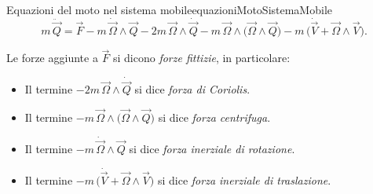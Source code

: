 \begin{remark}{Equazioni del moto nel sistema mobile}{equazioniMotoSistemaMobile}
	\[
		m\,\ddot{\vec{Q}} = \vec{F} - m\,\dot{\vec{\Omega}}\wedge\vec{Q}-2m\,\vec{\Omega}\wedge\dot{\vec{Q}}-m\,\vec{\Omega}\wedge\big(\vec{\Omega}\wedge\vec{Q}\big) -m\,\big(\dot{\vec{V}}+\vec{\Omega}\wedge\vec{V}\big).
	\]
\end{remark}

\begin{notz}
	Le forze aggiunte a \(\vec{F}\) si dicono \emph{forze fittizie}, in particolare:
	\begin{itemize}
		\item Il termine \(-2m\,\vec{\Omega}\wedge\dot{\vec{Q}}\) si dice \emph{forza di Coriolis}.
		\item Il termine \(-m\,\vec{\Omega}\wedge\big(\vec{\Omega}\wedge\vec{Q}\big)\) si dice \emph{forza centrifuga}.
		\item Il termine \(-m\,\dot{\vec{\Omega}}\wedge\vec{Q}\) si dice \emph{forza inerziale di rotazione}.
		\item Il termine \(-m\,\big(\dot{\vec{V}}+\vec{\Omega}\wedge\vec{V}\big)\) si dice \emph{forza inerziale di traslazione}.
	\end{itemize}
\end{notz}